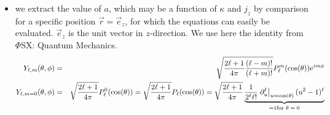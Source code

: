 \documentclass[11pt,a4paper]{report}
\begin{document}
\begin{itemize}
\begin{myshadowminipage}{Prooven sofar}
Robert Schade checked that in the convention of the CP-PAW code
the phase has the value $\phi_{\kappa,j_z}=\pi$.
\end{myshadowminipage}


\item we extract the value of $a$, which may be a function of $\kappa$
  and $j_z$ by comparison for a specific position $\vec{r}=\vec{e}_z$,
  for which the equations can easily be evaluated. $\vec{e}_z$ is the
  unit vector in $z$-direction. We use here the identity from $\Phi$SX:  Quantum Mechanics.
\begin{eqnarray*}
Y_{\ell,m}(\theta,\phi)&=&\sqrt{\frac{2\ell+1}{4\pi}\frac{(\ell-m)!}{(\ell+m)!}}
P^{m}_\ell(\cos(\theta))\mathrm{e}^{im\phi}
\\
Y_{\ell,m=0}(\theta,\phi)&=&
\sqrt{\frac{2\ell+1}{4\pi}}P^{0}_\ell(\cos(\theta))
=\sqrt{\frac{2\ell+1}{4\pi}}P_\ell(\cos(\theta))
=\sqrt{\frac{2\ell+1}{4\pi}}
\underbrace{\frac{1}{2^\ell\ell!}
\left.\partial_u^\ell\right|_{u=\cos(\theta)}(u^2-1)^\ell}_{=1\text{for $\theta=0$}}
\end{eqnarray*}



\end{itemize}
\end{document}
